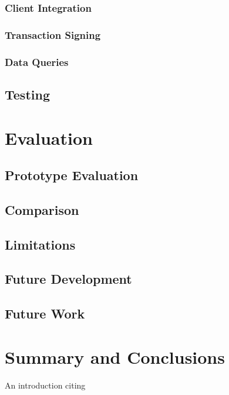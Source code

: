 \documentclass[a4paper]{article}
\begin{document}
\subsubsection{Client Integration}
\subsubsection{Transaction Signing}
\subsubsection{Data Queries}

\subsection{Testing}
\newpage

\section{Evaluation}
\subsection{Prototype Evaluation}
\subsection{Comparison}
\subsection{Limitations}
\subsection{Future Development}
\subsection{Future Work}
\newpage

\section{Summary and Conclusions}
An introduction citing \cite{Liviosgier}

\newpage



\end{document}
